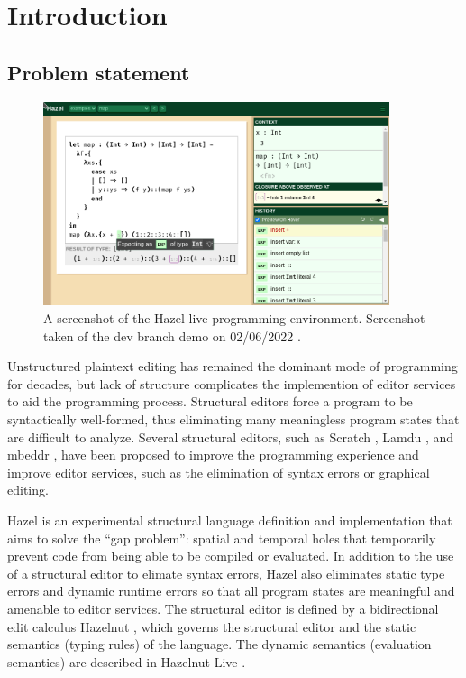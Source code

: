 \chapter{Introduction}
\label{sec:introduction}

\section{Problem statement}
\label{sec:prob_stmt}

\begin{figure}
  \centering
  \includegraphics[width=4in]{img/hazel_ui.png}
  \caption[Screenshot of the Hazel live programming environment.]{A screenshot of the Hazel live programming environment. Screenshot taken of the dev branch demo on 02/06/2022 \cite{HazelDemo2022}.}
  \label{fig:screenshot-hazel-ui}
\end{figure}

Unstructured plaintext editing has remained the dominant mode of programming for decades, but lack of structure complicates the implemention of editor services to aid the programming process. Structural editors force a program to be syntactically well-formed, thus eliminating many meaningless program states that are difficult to analyze. Several structural editors, such as Scratch \cite{maloney2010scratch}, Lamdu \cite{lotem_chuchem}, and mbeddr \cite{voelter2012mbeddr}, have been proposed to improve the programming experience and improve editor services, such as the elimination of syntax errors or graphical editing.

Hazel \cite{hazel_git} is an experimental structural language definition and implementation that aims to solve the ``gap problem'': spatial and temporal holes that temporarily prevent code from being able to be compiled or evaluated. In addition to the use of a structural editor to elimate syntax errors, Hazel also eliminates static type errors and dynamic runtime errors so that all program states are meaningful and amenable to editor services. The structural editor is defined by a bidirectional edit calculus Hazelnut \cite{conf/popl/Hazelnut17}, which governs the structural editor and the static semantics (typing rules) of the language. The dynamic semantics (evaluation semantics) are described in Hazelnut Live \cite{conf/popl/HazelnutLive19}.


